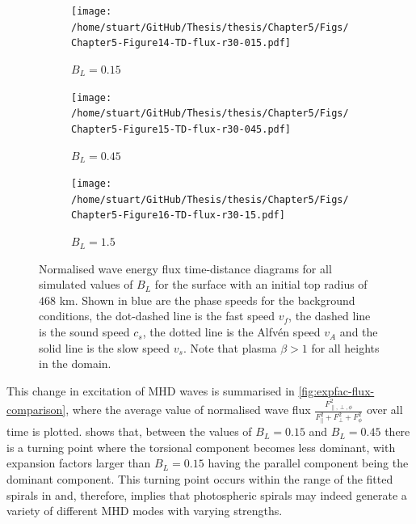 \documentclass[a4paper,12pt,fourier,authoryear,custommargin]{Classes/PhDThesisPSnPDF}
\begin{document}
\begin{figure}
    \centering
\ContinuedFloat
    

    \begin{subfigure}[b]{0.9\columnwidth}
        \texttt{[image: /home/stuart/GitHub/Thesis/thesis/Chapter5/Figs/Chapter5-Figure14-TD-flux-r30-015.pdf]}
        \caption{$B_L = 0.15$}
        \label{fig:TD-flux-r30-015}
    \end{subfigure}

    \begin{subfigure}[b]{0.9\columnwidth}
        \texttt{[image: /home/stuart/GitHub/Thesis/thesis/Chapter5/Figs/Chapter5-Figure15-TD-flux-r30-045.pdf]}
        \caption{$B_L = 0.45$}
        \label{fig:TD-flux-r30-045}
    \end{subfigure}
    \caption{}
    \label{fig:}
\end{figure}

\begin{figure}
    \centering
\ContinuedFloat
    

    \begin{subfigure}[b]{0.9\columnwidth}
        \texttt{[image: /home/stuart/GitHub/Thesis/thesis/Chapter5/Figs/Chapter5-Figure16-TD-flux-r30-15.pdf]}
        \caption{$B_L = 1.5$}
        \label{fig:TD-flux-r30-15}
    \end{subfigure}
    \caption{Normalised wave energy flux time-distance diagrams for all simulated values of $B_L$ for the surface with an initial top radius of $468$ km. Shown in blue are the phase speeds for the background conditions, the dot-dashed line is the fast speed $v_f$, the dashed line is the sound speed $c_s$, the dotted line is the Alfv\'en speed $v_A$ and the solid line is the slow speed $v_s$. Note that plasma $\beta > 1$ for all heights in the domain.}
    \label{fig:TD-flux-r30}
\end{figure}


This change in excitation of MHD waves is summarised in \cref{fig:expfac-flux-comparison}, where the average value of normalised wave flux $\displaystyle\frac{F_{\parallel, \perp, \phi}^2}{F_\parallel^2 + F_\perp^2 + F_\phi^2}$ over all time is plotted.
 shows that, between the values of $B_L=0.15$ and $B_L=0.45$ there is a turning point where the torsional component becomes less dominant, with expansion factors larger than $B_L=0.15$ having the parallel component being the dominant component.
This turning point occurs within the range of the fitted spirals in \cite{bonet2008} and, therefore, implies that photospheric spirals may indeed generate a variety of different MHD modes with varying strengths.
\end{document}
